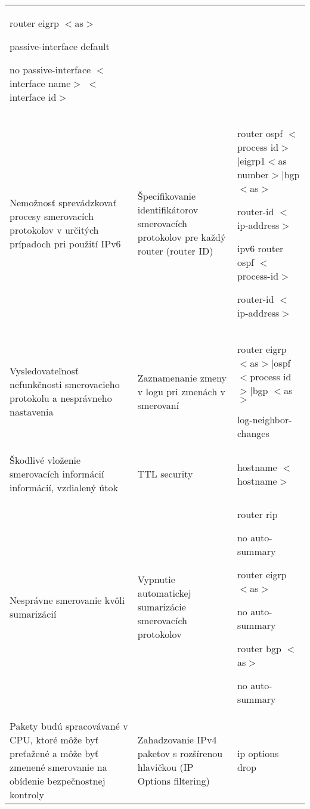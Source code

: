 \begin{longtable}[!htbp]{|L{10em}L{10em}>{\selectfont}L{34em}|}
	router eigrp $<$as$>$
	
	\hspace{0.5em}passive-interface default
	
	\hspace{0.5em}no passive-interface $<$interface name$>$ $<$interface id$>$\\
	
	
	
	
	Nemožnosť sprevádzkovať procesy smerovacích protokolov v určitých prípadoch pri použití IPv6	&Špecifikovanie identifikátorov smerovacích protokolov pre každý router (router ID)	&router ospf $<$process id$>$|eigrp1$<$as number$>$|bgp$<$as$>$
	
	\hspace{0.5em}router-id $<$ip-address$>$ 
	
	ipv6 router ospf  $<$process-id$>$
	
	\hspace{0.5em} router-id $<$ip-address$>$ \\
	
	
	
	
	 Vysledovateľnosť nefunkčnosti smerovacieho protokolu a nesprávneho nastavenia	&Zaznamenanie zmeny v logu pri zmenách v smerovaní	&router eigrp $<$as$>$|ospf $<$process id$>$|bgp $<$as$>$
	
	\hspace{0.5em}log-neighbor-changes\\
	
	
	
	Škodlivé vloženie smerovacích informácií informácií, vzdialený útok	&TTL security	&hostname $<$hostname$>$\\
	
	
	
	 Nesprávne smerovanie kvôli sumarizácií	&Vypnutie automatickej sumarizácie smerovacích protokolov	&router rip
	
	\hspace{0.5em}no auto-summary
	
	router eigrp $<$as$>$
	
	\hspace{0.5em}no auto-summary
	
	router bgp $<$as$>$
	
	\hspace{0.5em}no auto-summary\\
	
	
	
	
	Pakety budú spracovávané v CPU, ktoré môže byť preťažené a môže byť zmenené smerovanie na obídenie bezpečnostnej kontroly	&Zahadzovanie IPv4 paketov s rozšírenou hlavičkou (IP Options filtering)	&ip options drop\\
	

\end{longtable}
